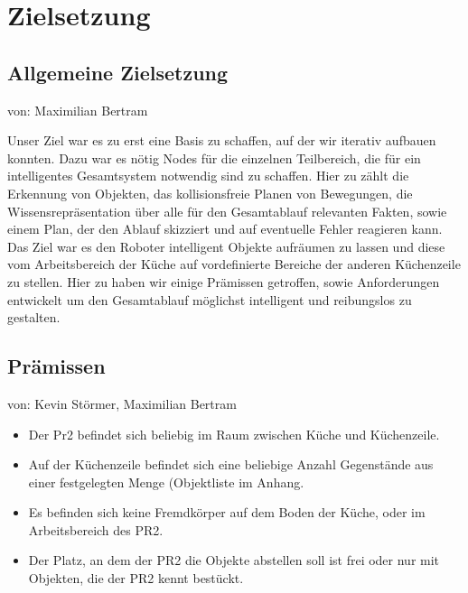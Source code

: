 \documentclass{suturo}
\makeatletter
\newcommand{\chapterauthor}[1]{%
  {\parindent0pt\vspace*{-27pt}%
  \linespread{0}\small\begin{flushright}von: #1\end{flushright}%
  \par\nobreak\vspace*{0pt}}
  \@afterheading%
}
\makeatother
\begin{document}
\newpage

\section{Zielsetzung}
\subsection{Allgemeine Zielsetzung}
\chapterauthor{Maximilian Bertram}
Unser Ziel war es zu erst eine Basis zu schaffen, auf der wir iterativ aufbauen konnten. Dazu war es nötig Nodes
für die einzelnen Teilbereich, die für ein intelligentes Gesamtsystem notwendig sind zu schaffen. Hier zu zählt
die Erkennung von Objekten, das kollisionsfreie Planen von Bewegungen, die Wissensrepräsentation über alle für den Gesamtablauf relevanten Fakten, sowie einem Plan, der den Ablauf skizziert und auf eventuelle Fehler reagieren kann. Das Ziel war es den Roboter intelligent Objekte aufräumen zu lassen und diese vom Arbeitsbereich der Küche auf vordefinierte Bereiche der anderen Küchenzeile zu stellen. Hier zu haben wir einige Prämissen getroffen, sowie Anforderungen entwickelt um den Gesamtablauf möglichst intelligent und reibungslos zu gestalten.

\subsection{Prämissen}
\chapterauthor{Kevin Störmer, Maximilian Bertram}
\begin{itemize}
\item Der Pr2 befindet sich beliebig im Raum zwischen Küche und Küchenzeile.
\item Auf der Küchenzeile befindet sich eine beliebige Anzahl Gegenstände aus einer festgelegten Menge (Objektliste im Anhang.
\item Es befinden sich keine Fremdkörper auf dem Boden der Küche, oder im Arbeitsbereich des PR2.
\item Der Platz, an dem der PR2 die Objekte abstellen soll ist frei oder nur mit Objekten, die der PR2 kennt bestückt.
\end{itemize}
\end{document}
